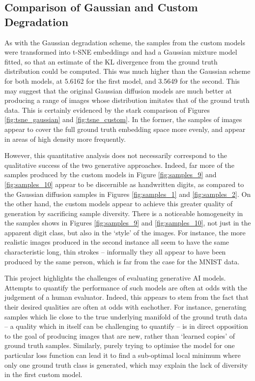 \documentclass[12pt]{article}
\begin{document}
\subsection{Comparison of Gaussian and Custom Degradation}

As with the Gaussian degradation scheme, the samples from the custom models were transformed into t-SNE embeddings and had a Gaussian mixture model fitted,
so that an estimate of the KL divergence from the ground truth distribution could be computed.
This was much higher than the Gaussian scheme for both models, at 5.6162 for the first model, and 3.5649 for the second.
This may suggest that the original Gaussian diffusion models are much better at producing a range of images whose distribution imitates that of the ground truth data.
This is certainly evidenced by the stark comparison of Figures \ref{fig:tsne_gaussian} and \ref{fig:tsne_custom}.
In the former, the samples of images appear to cover the full ground truth embedding space more evenly, and appear in areas of high density more frequently.

However, this quantitative analysis does not necessarily correspond to the qualitative success of the two generative approaches.
Indeed, far more of the samples produced by the custom models in Figure \ref{fig:samples_9} and \ref{fig:samples_10} appear to be discernible as handwritten digits,
as compared to the Gaussian diffusion samples in Figures \ref{fig:samples_1} and \ref{fig:samples_2}.
On the other hand, the custom models appear to achieve this greater quality of generation by sacrificing sample diversity.
There is a noticeable homogeneity in the samples shows in Figures \ref{fig:samples_9} and \ref{fig:samples_10},
not just in the apparent digit class, but also in the `style' of the images.
For instance, the more realistic images produced in the second instance all seem to have the same characteristic long, thin strokes --
informally they all appear to have been produced by the same person, which is far from the case for the MNIST data.

This project highlights the challenges of evaluating generative AI models.
Attempts to quantify the performance of such models are often at odds with the judgement of a human evaluator.
Indeed, this appears to stem from the fact that their desired qualities are often at odds with eachother.
For instance, generating samples which lie close to the true underlying manifold of the ground truth data --
a quality which in itself can be challenging to quantify --
is in direct opposition to the goal of producing images that are new, rather than `learned copies' of ground truth samples.
Similarly, purely trying to optimise the model for one particular loss function can lead it to find a sub-optimal local minimum where only one ground truth class is generated,
which may explain the lack of diversity in the first custom model.
\end{document}

